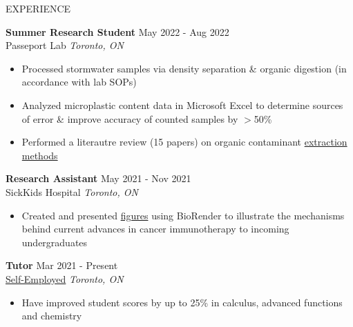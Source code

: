 \documentclass{resume} %
\begin{document}
\begin{rSection}{EXPERIENCE}

\textbf{Summer Research Student} \hfill May 2022 - Aug 2022\\
Passeport Lab \hfill \textit{Toronto, ON}
\vspace{-0.2cm}
 \begin{itemize}
    \itemsep -8pt {} 
    \item Processed stormwater samples via density separation \& organic digestion (in accordance with lab SOPs)
   \item Analyzed microplastic content data in Microsoft Excel to determine sources of error \& improve accuracy of counted samples by $>$50\% 
    \item Performed a literautre review (15 papers) on organic contaminant \href{https://drive.google.com/file/d/1tVPh5Zt4zLT8spiLfzJ4vu0XZSuMfOfu/view}{extraction methods}
 \end{itemize}
 
\textbf{Research Assistant} \hfill May 2021 - Nov 2021\\
SickKids Hospital \hfill \textit{Toronto, ON}
\vspace{-0.2cm}
 \begin{itemize}
    \itemsep -8pt {} 
     \item Created and presented \href{https://drive.google.com/file/d/1459llsxjfB4-UA4sHfnBQ7wem0znVUL5/view?usp=sharing}{figures} using BioRender to illustrate the mechanisms behind current advances in cancer immunotherapy to incoming undergraduates
 \end{itemize}

\textbf{Tutor} \hfill Mar 2021 - Present \\
\href{https://www.overleaf.com/read/qybvrsfbsbwq}{Self-Employed} \hfill \textit{Toronto, ON} 
\vspace{-0.2cm}
\begin{itemize}
   \itemsep -8pt {} 
   \item  Have improved student scores by up to 25\% in calculus, advanced functions and chemistry 
\end{itemize}
\end{rSection} 

\end{document}
